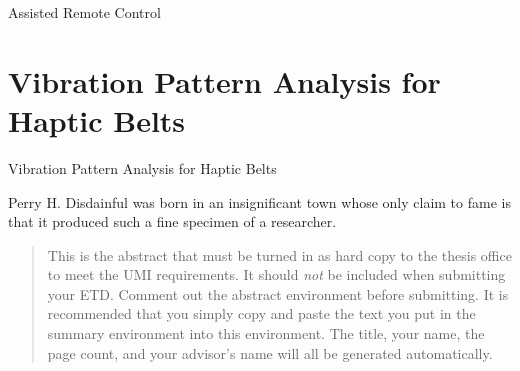 \documentclass[12pt]{gatech-thesis}
\begin{document}
Assisted Remote Control

\chapter{Vibration Pattern Analysis for Haptic Belts}
\label{chapter:vibration_pattern_analysis_for_haptic_belts}

Vibration Pattern Analysis for Haptic Belts


\begin{postliminary}
{}
\begin{vita}
Perry H. Disdainful was born in an insignificant town
whose only claim to fame is that it produced such a fine
specimen of a researcher.
\end{vita}
\end{postliminary}

\begin{abstract}
  This is the abstract that must be turned in as hard copy to the
  thesis office to meet the UMI requirements. It should \emph{not} be
  included when submitting your ETD. Comment out the abstract
  environment before submitting. It is recommended that you simply
  copy and paste the text you put in the summary environment into this
  environment. The title, your name, the page count, and your
  advisor's name will all be generated automatically.
\end{abstract}
\end{document}
